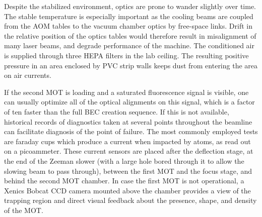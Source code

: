 	Despite the stabilized environment, optics are prone to wander slightly over time.
	The stable temperature is especially important as the cooling beams are coupled from the AOM tables to the vacuum chamber optics by free-space links.
	Drift in the relative position of the optics tables would therefore result in misalignment of many laser beams, and degrade performance of the machine.
	The conditioned air is supplied through three HEPA filters in the lab ceiling.
	The resulting positive pressure in an area enclosed by PVC strip walls keeps dust from entering the area on air currents.
	

	If the second MOT is loading and a saturated fluorescence signal is visible, one can usually optimize all of the optical alignments on this signal, which is a factor of ten faster than the full BEC creation sequence.
	If this is not available, historical records of diagnostics taken at several points throughout the beamline can facilitate diagnosis of the point of failure.
	The most commonly employed tests are faraday cups which produce a current when impacted by \mhe atoms, as read out on a picoammeter.
	These current sensors are placed after the deflection stage, at the end of the Zeeman slower (with a large hole bored through it to allow the slowing beam to pass through), between the first MOT and the focus stage, and behind the second MOT chamber.
	In case the first MOT is not operational, a Xenics Bobcat CCD camera mounted above the chamber provides a view of the trapping region and direct visual feedback about the presence, shape, and density of the MOT.
	



